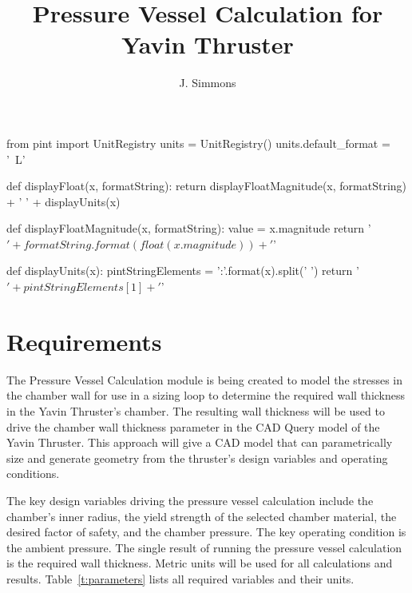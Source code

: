 \documentclass{article}
\title{Pressure Vessel Calculation for Yavin Thruster}
\author{J. Simmons}
\begin{document}
\maketitle

\begin{sagesilent}
from pint import UnitRegistry
units = UnitRegistry()
units.default_format = '~L'

def displayFloat(x, formatString):
  return displayFloatMagnitude(x, formatString) + ' ' + displayUnits(x)
  
def displayFloatMagnitude(x, formatString):
  value = x.magnitude
  return '$' + formatString.format(float(x.magnitude)) + '$'
  
def displayUnits(x):
  pintStringElements = '{:}'.format(x).split(' ')
  return '$' + pintStringElements[1] + '$'
  
\end{sagesilent}

\section{Requirements}
The Pressure Vessel Calculation module is being created to model the stresses in the chamber wall for use in a sizing loop to determine the required wall thickness in the Yavin Thruster's chamber.  The resulting wall thickness will be used to drive the chamber wall thickness parameter in the CAD Query model of the Yavin Thruster.  This approach will give a CAD model that can parametrically size and generate geometry from the thruster's design variables and operating conditions. 

The key design variables driving the pressure vessel calculation include the chamber's inner radius, the yield strength of the selected chamber material, the desired factor of safety, and the chamber pressure.  The key operating condition is the ambient pressure.  The single result of running the pressure vessel calculation is the required wall thickness. Metric units will be used for all calculations and results.  Table~\ref{t:parameters} lists all required variables and their units.
\end{document}
